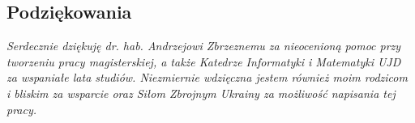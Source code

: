 \begin{specialthanks}
\section*{Podziękowania}
\textit{Serdecznie dziękuję dr. hab. Andrzejowi Zbrzeznemu za nieocenioną pomoc przy tworzeniu pracy magisterskiej, a także Katedrze Informatyki i Matematyki UJD za wspaniałe lata studiów. Niezmiernie wdzięczna jestem również moim rodzicom i bliskim za wsparcie oraz Siłom Zbrojnym Ukrainy za możliwość napisania tej pracy.}
\end{specialthanks}

